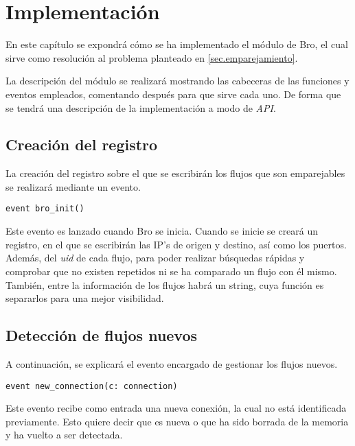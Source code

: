 \chapter{Implementación}\label{implementacion}

En este capítulo se expondrá cómo se ha implementado el módulo de Bro, el cual sirve como resolución al problema planteado en 
\ref{sec.emparejamiento}.

\intro La descripción del módulo se realizará mostrando las cabeceras de las funciones y eventos empleados, comentando después para 
que sirve cada uno. De forma que se tendrá una descripción de la implementación a modo de \textit{API}.

\section{Creación del registro}

La creación del registro sobre el que se escribirán los flujos que son emparejables se realizará mediante un evento.

\begin{lstlisting}[style=CodigoC]
event bro_init()

\end{lstlisting}

\intro Este evento es lanzado cuando Bro se inicia. Cuando se inicie se creará un registro, en el que se escribirán las IP's de origen 
y destino, así como los puertos. Además, del \textit{uid} de cada flujo, para poder realizar búsquedas rápidas y comprobar que no existen repetidos ni se ha comparado un flujo con él mismo. También, entre la 
información de los flujos habrá un string, cuya función es separarlos para una mejor visibilidad.

\section{Detección de flujos nuevos}

A continuación, se explicará el evento encargado de gestionar los flujos nuevos.

\begin{lstlisting}[style=CodigoC]
event new_connection(c: connection)

\end{lstlisting}

\intro Este evento recibe como entrada una nueva conexión, la cual no está identificada previamente. Esto quiere decir que es nueva
o que ha sido borrada de la memoria y ha vuelto a ser detectada.

